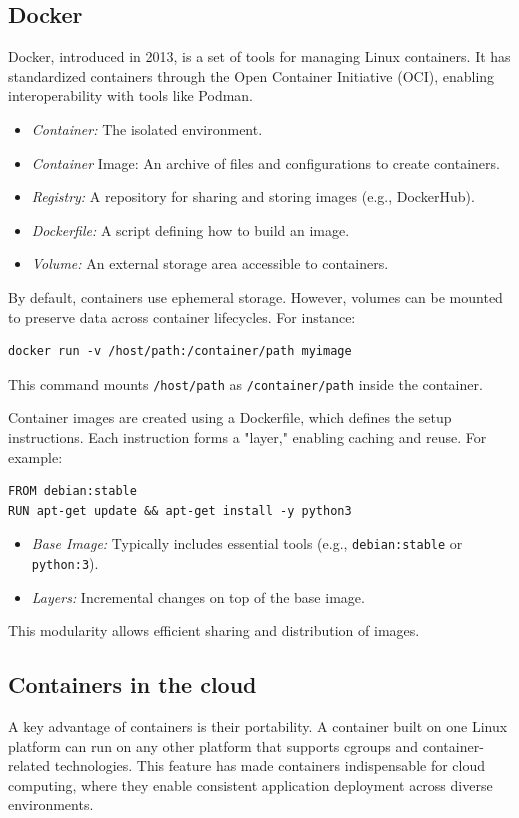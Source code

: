 \subsection*{Docker}
Docker, introduced in 2013, is a set of tools for managing Linux containers. It has standardized containers through the Open Container Initiative (OCI), enabling interoperability with tools like Podman.
\begin{itemize}
    \item \textit{Container:} The isolated environment.
    \item \textit{Container }Image: An archive of files and configurations to create containers.
    \item \textit{Registry:} A repository for sharing and storing images (e.g., DockerHub).
    \item \textit{Dockerfile:} A script defining how to build an image.
    \item \textit{Volume:} An external storage area accessible to containers.
\end{itemize}
By default, containers use ephemeral storage. However, volumes can be mounted to preserve data across container lifecycles. For instance:
\begin{verbatim}
docker run -v /host/path:/container/path myimage    
\end{verbatim}
This command mounts \texttt{/host/path} as \texttt{/container/path} inside the container.

Container images are created using a Dockerfile, which defines the setup instructions. Each instruction forms a "layer," enabling caching and reuse. For example:
\begin{verbatim}
FROM debian:stable
RUN apt-get update && apt-get install -y python3    
\end{verbatim}
\begin{itemize}
    \item \textit{Base Image:} Typically includes essential tools (e.g., \texttt{debian:stable} or \texttt{python:3}).
    \item \textit{Layers:} Incremental changes on top of the base image.
\end{itemize}
This modularity allows efficient sharing and distribution of images.

\subsection*{Containers in the cloud}
A key advantage of containers is their portability. A container built on one Linux platform can run on any other platform that supports cgroups and container-related technologies. This feature has made containers indispensable for cloud computing, where they enable consistent application deployment across diverse environments.

